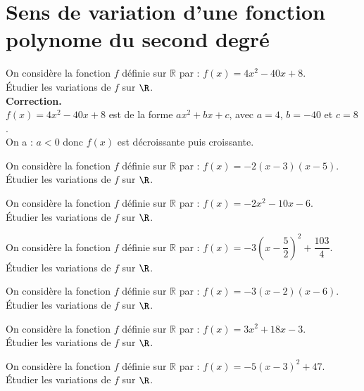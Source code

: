 \documentclass[11pt]{article}
\begin{document}
\vspace{-1cm}
\section{Sens de variation d'une fonction polynome du second degré}

\vspace{-.5cm}
\begin{exercice}
On considère la fonction $f$ définie sur $\mathbb{R}$ par :
$f(x)=4x^2-40x+8$. \\
Étudier les variations de $f$ sur $\R$.\\
\textbf{Correction.}\\
$f(x)=4x^2-40x+8$ est de la forme $ax^2+bx+c$, avec $a=4$, $b=-40$ et
$c=8$. \\
On a : $a < 0$ donc $f(x)$ est décroissante puis croissante. 
\end{exercice}

\begin{exercice}
  \begin{multicols}{2}
    \begin{enu}
      \item On considère la fonction $f$ définie sur $\mathbb{R}$ par
        : $f(x)=-2(x-3)(x-5)$.\\Étudier les variations de $f$ sur
        $\R$.
      \item On considère la fonction $f$ définie sur $\mathbb{R}$ par
        : $f(x)=-2x^2-10x-6$.\\Étudier les variations de $f$ sur $\R$.
      \item On considère la fonction $f$ définie sur $\mathbb{R}$ par
        :
        $f(x)=-3\left(x -\dfrac{5}{2}\right)^2
        +\dfrac{103}{4}$.\\Étudier les variations de $f$ sur $\R$.
      \item On considère la fonction $f$ définie sur $\mathbb{R}$ par
        : $f(x)=-3(x-2)(x-6)$.\\Étudier les variations de $f$ sur
        $\R$.
      \item On considère la fonction $f$ définie sur $\mathbb{R}$ par
        : $f(x)=3x^2+18x-3$.\\Étudier les variations de $f$ sur $\R$.
      \item On considère la fonction $f$ définie sur $\mathbb{R}$ par
        : $f(x)=-5\left(x -3\right)^2 +47$.\\Étudier les variations de
        $f$ sur $\R$.
    \end{enu}
  \end{multicols}
\end{exercice}
\end{document}
